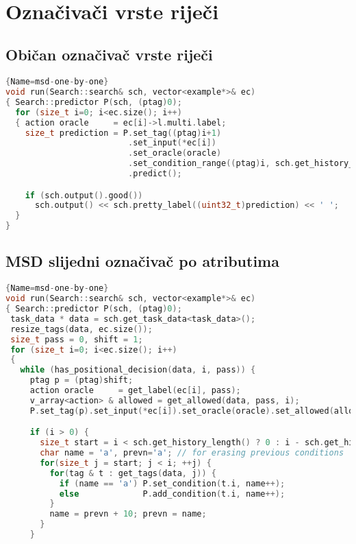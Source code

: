 \begin{appendix}\

\chapter{Označivači vrste riječi}
\section{Običan označivač vrste riječi}
\label{appendix:postagging}
\begin{lstlisting}[language=C++,
                   basicstyle=\tiny\ttfamily]{Name=msd-one-by-one}
void run(Search::search& sch, vector<example*>& ec)
{ Search::predictor P(sch, (ptag)0);
  for (size_t i=0; i<ec.size(); i++)
  { action oracle     = ec[i]->l.multi.label;
    size_t prediction = P.set_tag((ptag)i+1)
                         .set_input(*ec[i])
                         .set_oracle(oracle)
                         .set_condition_range((ptag)i, sch.get_history_length(), 'p')
                         .predict();

    if (sch.output().good())
      sch.output() << sch.pretty_label((uint32_t)prediction) << ' ';
  }
}
\end{lstlisting}
\newpage
\section{MSD slijedni označivač po atributima}\label{appendix:msdattr}
\begin{lstlisting}[language=C++,
                   basicstyle=\tiny\ttfamily]{Name=msd-one-by-one}
void run(Search::search& sch, vector<example*>& ec)
{ Search::predictor P(sch, (ptag)0);
 task_data * data = sch.get_task_data<task_data>();
 resize_tags(data, ec.size());
 size_t pass = 0, shift = 1;
 for (size_t i=0; i<ec.size(); i++)
 {
   while (has_positional_decision(data, i, pass)) {
     ptag p = (ptag)shift;
     action oracle     = get_label(ec[i], pass);
     v_array<action> & allowed = get_allowed(data, pass, i);
     P.set_tag(p).set_input(*ec[i]).set_oracle(oracle).set_allowed(allowed);

     if (i > 0) {
       size_t start = i < sch.get_history_length() ? 0 : i - sch.get_history_length();
       char name = 'a', prevn='a'; // for erasing previous conditions
       for(size_t j = start; j < i; ++j) {
         for(tag & t : get_tags(data, j)) {
           if (name == 'a') P.set_condition(t.i, name++);
           else             P.add_condition(t.i, name++);
         }
         name = prevn + 10; prevn = name;
       }
     }


\end{lstlisting}
\end{appendix}
